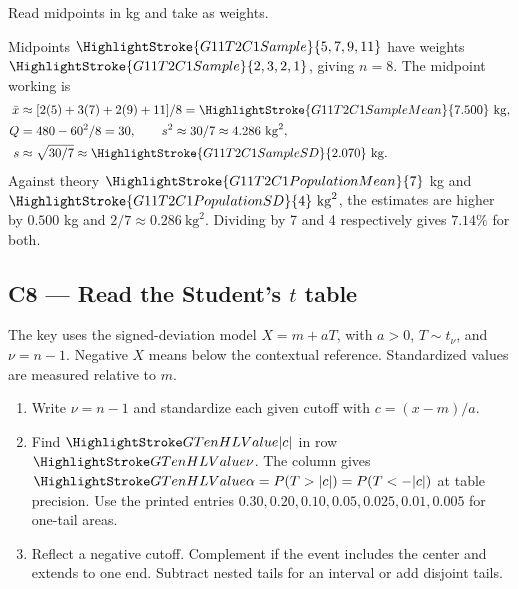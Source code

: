 \noindent
\begin{minipage}[t]{0.43\linewidth}
\vspace{0pt}
  {Read midpoints in kg and take  as weights.}
\end{minipage}\hfill
\begin{minipage}[t]{0.54\linewidth}
\vspace{0pt}
Midpoints \(\HighlightStroke{G11T2C1Sample}{5,7,9,11}\) have weights \(\HighlightStroke{G11T2C1Sample}{2,3,2,1}\), giving \(n=8\). The midpoint working is
\begin{align*}
 \bar x&\approx[2(5)+3(7)+2(9)+11]/8=\HighlightStroke{G11T2C1SampleMean}{7.500}\ \mathrm{kg},\\
 Q&=480-60^2/8=30,\qquad s^2\approx30/7\approx4.286\ \mathrm{kg}^2,\\
 s&\approx\sqrt{30/7}\approx\HighlightStroke{G11T2C1SampleSD}{2.070}\ \mathrm{kg}.
\end{align*}
Against theory \(\HighlightStroke{G11T2C1PopulationMean}{7}\) kg and \(\HighlightStroke{G11T2C1PopulationSD}{4}\ \mathrm{kg}^2\), the estimates are higher by \(0.500\) kg and \(2/7\approx0.286\ \mathrm{kg}^2\). Dividing by 7 and 4 respectively gives \(7.14\%\) for both.
\end{minipage}
\par\nobreak
{}

\clearpage
\subsection{C8 --- Read the Student's \texorpdfstring{\(t\)}{t} table}\label{crit:c8}
The key uses the signed-deviation model \(X=m+aT\), with \(a>0\), \(T\sim t_\nu\), and \(\nu=n-1\). Negative \(X\) means below the contextual reference. Standardized values are measured relative to \(m\).

\begin{enumerate}
  \item Write \(\nu=n-1\) and standardize each given cutoff with \(c=(x-m)/a\).
  \item Find \(\OutlineLookup{|c|}\) in row \(\OutlineLookup{\nu}\). The column gives \(\OutlineLookup{\alpha}=P(T>|c|)=P(T<-|c|)\) at table precision. Use the printed entries \(0.30,0.20,0.10,0.05,0.025,0.01,0.005\) for one-tail areas.
  \item Reflect a negative cutoff. Complement if the event includes the center and extends to one end. Subtract nested tails for an interval or add disjoint tails. 
\end{enumerate}

